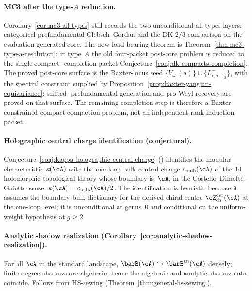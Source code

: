 \paragraph{MC3 after the type-$A$ reduction.}
Corollary~\ref{cor:mc3-all-types} still records the two unconditional
all-types layers: categorical prefundamental Clebsch--Gordan and the
DK-2/3 comparison on the evaluation-generated core.
The new load-bearing theorem is
Theorem~\ref{thm:mc3-type-a-resolution}: in type~$A$ the old
four-packet post-core problem is reduced to the single compact-
completion packet
Conjecture~\ref{conj:dk-compacts-completion}. The proved post-core
surface is the Baxter-locus seed
$\{V_{\omega_i}(a)\}\cup\{L^-_{i,a-\frac{1}{2}}\}$, with the spectral
constraint supplied by
Proposition~\ref{prop:baxter-yangian-equivariance}; shifted-
prefundamental generation and pro-Weyl recovery are proved on that
surface. The remaining completion step is therefore a Baxter-
constrained compact-completion problem, not an independent
rank-induction packet.


\paragraph{Holographic central charge identification (conjectural).}
Conjecture~\ref{conj:kappa-holographic-central-charge}
(\ClaimStatusConjectured) identifies the modular characteristic
$\kappa(\cA)$ with the one-loop bulk central charge
$c_{\mathrm{bulk}}(\cA)$ of the $3$d holomorphic-topological
theory whose boundary is~$\cA$, in the Costello--Dimofte--Gaiotto
sense: $\kappa(\cA) = c_{\mathrm{bulk}}(\cA)/2$. The
identification is heuristic because it assumes the
boundary-bulk dictionary for the derived chiral centre
$\cZ^{\mathrm{der}}_{\mathrm{ch}}(\cA)$ at the one-loop level;
it is unconditional at genus~$0$ and conditional on the
uniform-weight hypothesis at $g \geq 2$.

\paragraph{Analytic shadow realization
\textup{(}Corollary~\textup{\ref{cor:analytic-shadow-realization}}\textup{)}.}
For all $\cA$ in the standard landscape,
$\barB(\cA) \hookrightarrow \barB^{\mathrm{an}}(\cA)$
densely; finite-degree shadows are algebraic; hence
the algebraic and analytic shadow data coincide.
Follows from HS-sewing
(Theorem~\ref{thm:general-hs-sewing}).


